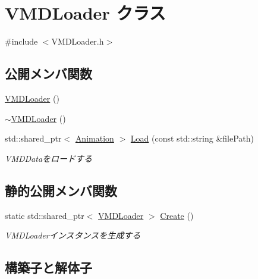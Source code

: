 \hypertarget{class_v_m_d_loader}{}\section{V\+M\+D\+Loader クラス}
\label{class_v_m_d_loader}


{\ttfamily \#include $<$V\+M\+D\+Loader.\+h$>$}

\subsection*{公開メンバ関数}
\begin{DoxyCompactItemize}
\item 
\mbox{\hyperlink{class_v_m_d_loader_a87124ac65ec0ecc82110063b3af64169}{V\+M\+D\+Loader}} ()
\item 
\mbox{\hyperlink{class_v_m_d_loader_a57df015efb122fb3d04f73feac588c22}{$\sim$\+V\+M\+D\+Loader}} ()
\item 
std\+::shared\+\_\+ptr$<$ \mbox{\hyperlink{class_animation}{Animation}} $>$ \mbox{\hyperlink{class_v_m_d_loader_aef220a556a4f5279010e6b6385fc716b}{Load}} (const std\+::string \&file\+Path)
\begin{DoxyCompactList}\small\item\em V\+M\+D\+Dataをロードする \end{DoxyCompactList}\end{DoxyCompactItemize}
\subsection*{静的公開メンバ関数}
\begin{DoxyCompactItemize}
\item 
static std\+::shared\+\_\+ptr$<$ \mbox{\hyperlink{class_v_m_d_loader}{V\+M\+D\+Loader}} $>$ \mbox{\hyperlink{class_v_m_d_loader_a88df1c7388a466fca58b9245064b3207}{Create}} ()
\begin{DoxyCompactList}\small\item\em V\+M\+D\+Loaderインスタンスを生成する \end{DoxyCompactList}\end{DoxyCompactItemize}


\subsection{構築子と解体子}
\mbox{\label{class_v_m_d_loader_a87124ac65ec0ecc82110063b3af64169}} 
